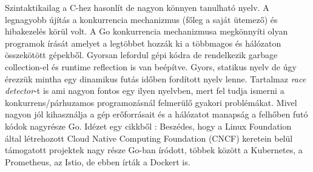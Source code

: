 Szintaktikailag a C-hez hasonlít de nagyon könnyen tanulható nyelv.
A legnagyobb újítás a konkurrencia mechanizmus (főleg a saját ütemező) és hibakezelés körül volt.
A Go konkurrencia mechanizmusa megkönnyíti olyan programok írását amelyet a legtöbbet hozzák ki a többmagos és hálózaton összekötött gépekből.
Gyorsan lefordul gépi kódra de rendelkezik garbage collection-el és runtime reflection is van beépítve.
Gyors, statikus nyelv de úgy érezzük mintha egy dinamikus futás időben fordított nyelv lenne.
Tartalmaz \textit{race detector}-t is ami nagyon fontos egy ilyen nyelvben, mert fel tudja ismerni a konkurrens/párhuzamos programozásnál felmerülő gyakori problémákat.
Mivel nagyon jól kihasználja a gép erőforrásait és a hálózatot manapság a felhőben futó kódok nagyrésze Go.
Idézet egy cikkből \cite{HWSW}:
Beszédes, hogy a Linux Foundation által létrehozott Cloud Native Computing Foundation (CNCF) keretein
belül támogatott projektek nagy része Go-ban íródott, többek között a Kubernetes, a Prometheus, az Istio, de ebben írták a Dockert is.


